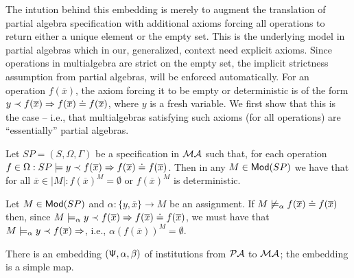\documentclass[10pt]{article}
\begin{document}
The intution behind this embedding is merely to augment the translation of
partial algebra specification with additional axioms forcing all operations
to return either a unique element or the empty set. This is the underlying
model in partial algebras which in our, generalized, context need explicit
axioms. Since operations in multialgebra are strict on the empty set, the
implicit strictness assumption from partial algebras, will be enforced
automatically.
For an operation $f(\overline x)$, the axiom forcing it to be empty or
deterministic is of the form $y\prec f(\overline x)\Rightarrow f(\overline x)\mathrel{\dot{=} }
f(\overline x)$, where $y$ is a fresh variable. We first show that this is
the case -- i.e., that
multialgebras satisfying such axioms (for all operations) are ``essentially''
partial algebras.
\begin{lemma}\label{le:esspa}
Let $SP=(S,\Omega,\Gamma)$ be a specification in ${\mathcal{MA}}$ such that, for
each operation $f\in\Omega:  
SP\models y \prec f(\overline{x}) \Rightarrow f(\overline{x}) \mathrel{\dot{=} } f(\overline{x})$.
Then in any $M\in{\sf {Mod}}(SP)$ we have that for all $\overline x\in|M|:f(\overline{x})^M=\emptyset$ or
$f(\overline x)^M$ is deterministic.
\end{lemma}
\begin{PROOF}
Let $M\in{\sf {Mod}}(SP)$ and $\alpha:\{y,\overline x\}\to M$ be an assignment. If
$M\not\models_\alpha f(\overline{x}) \mathrel{\dot{=} } f(\overline{x})$ then, since
$M\models_\alpha y\prec f(\overline x)\Rightarrow f(\overline x)\mathrel{\dot{=} } f(\overline x)$,
we must have that $M\models_\alpha y\prec f(\overline x)\Rightarrow$, i.e., 
$\alpha(f(\overline x))^M=\emptyset$.
\end{PROOF}
%
%
\begin{proposition}\label{prop:PaMa}
There is an embedding $({\sf {\Psi}},\alpha, \beta)$ of institutions from
${\mathcal{PA}}$ to ${\mathcal{MA}}$; the embedding is a simple map.
\end{proposition}
%
\end{document}
